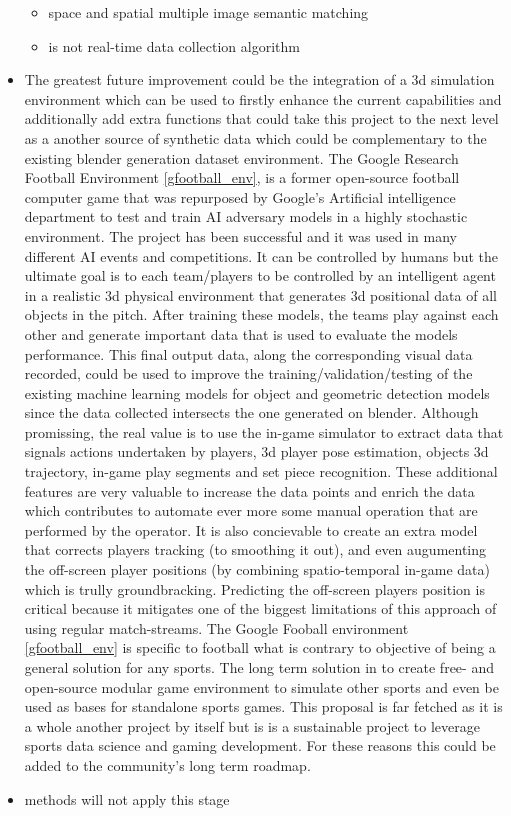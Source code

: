 \documentclass[
11pt,
twoside
]{report}
\begin{document}
\begin{itemize}
\begin{itemize}
  \item
    space and spatial multiple image semantic matching
    \item
      is not real-time data collection algorithm
  \end{itemize}
\item
The greatest future improvement could be the integration of a 3d simulation environment which can be used to firstly enhance the current capabilities and additionally add extra functions that could take this project to the next level as a another source of synthetic data which could be complementary to the existing blender generation dataset environment. The Google Research Football Environment \ref{gfootball_env}, is a former open-source football computer game that was repurposed by Google's Artificial intelligence department to test and train AI adversary models in a highly stochastic environment. The project has been successful and it was used in many different AI events and competitions. It can be controlled by humans but the ultimate goal is to each team/players to be controlled by an intelligent agent in a realistic 3d physical environment that generates 3d positional data of all objects in the pitch. After training these models, the teams play against each other and generate important data that is used to evaluate the models performance. This final output data, along the corresponding visual data recorded, could be used to improve the training/validation/testing of the existing machine learning models for object and geometric detection models since the data collected intersects the one generated on blender. Although promissing, the real value is to use the in-game simulator to extract data that signals actions undertaken by players, 3d player pose estimation, objects 3d trajectory, in-game play segments and set piece recognition. These additional features are very valuable to increase the data points and enrich the data which contributes to automate ever more some manual operation that are performed by the operator. It is also concievable to create an extra model that corrects players tracking (to smoothing it out), and even augumenting the off-screen player positions (by combining spatio-temporal in-game data) which is trully groundbracking. Predicting the off-screen players position is critical because it mitigates one of the biggest limitations of this approach of using regular match-streams.
The Google Fooball environment \ref{gfootball_env} is specific to football what is contrary to objective of being a general solution for any sports. The long term solution in to create free- and open-source modular game environment to simulate other sports and even be used as bases for standalone sports games. This proposal is far fetched as it is a whole another project by itself but is is a sustainable project to leverage sports data science and gaming development. For these reasons this could be added to the community's long term roadmap.
\item
  methods will not apply this stage


\end{itemize}
\end{document}

